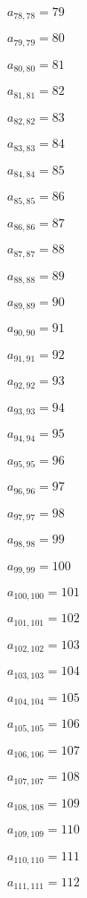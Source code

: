 \documentclass[a4paper,12pt]{article}
\begin{document}
$a _{ 78, 78 } = 79$

$a _{ 79, 79 } = 80$

$a _{ 80, 80 } = 81$

$a _{ 81, 81 } = 82$

$a _{ 82, 82 } = 83$

$a _{ 83, 83 } = 84$

$a _{ 84, 84 } = 85$

$a _{ 85, 85 } = 86$

$a _{ 86, 86 } = 87$

$a _{ 87, 87 } = 88$

$a _{ 88, 88 } = 89$

$a _{ 89, 89 } = 90$

$a _{ 90, 90 } = 91$

$a _{ 91, 91 } = 92$

$a _{ 92, 92 } = 93$

$a _{ 93, 93 } = 94$

$a _{ 94, 94 } = 95$

$a _{ 95, 95 } = 96$

$a _{ 96, 96 } = 97$

$a _{ 97, 97 } = 98$

$a _{ 98, 98 } = 99$

$a _{ 99, 99 } = 100$

$a _{ 100, 100 } = 101$

$a _{ 101, 101 } = 102$

$a _{ 102, 102 } = 103$

$a _{ 103, 103 } = 104$

$a _{ 104, 104 } = 105$

$a _{ 105, 105 } = 106$

$a _{ 106, 106 } = 107$

$a _{ 107, 107 } = 108$

$a _{ 108, 108 } = 109$

$a _{ 109, 109 } = 110$

$a _{ 110, 110 } = 111$

$a _{ 111, 111 } = 112$
\end{document}
